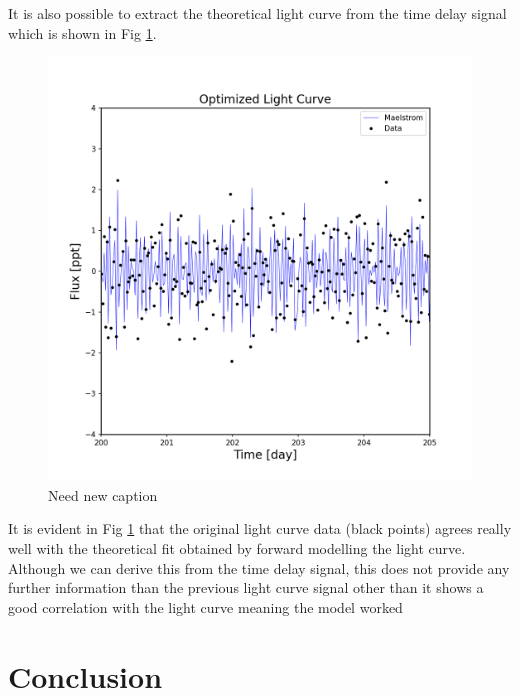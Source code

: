 \documentclass[]{article}
\begin{document}
It is also possible to extract the theoretical light curve from the time delay signal which is shown in Fig \ref{fig:LightcurveOptimized}.
\begin{figure}[H]
    \centering
    \includegraphics[width=1\linewidth]{lightcurve_opt.png}
      \caption{Need new caption}
      \label{fig:LightcurveOptimized}
\end{figure}

It is evident in Fig \ref{fig:LightcurveOptimized} that the original light curve data (black points) agrees really well with the theoretical fit obtained by forward modelling the light curve.
Although we can derive this from the time delay signal, this does not provide any further information than the previous light curve signal other than it shows a good correlation with the light curve meaning the model worked

\section{Conclusion}


        
\end{document}

